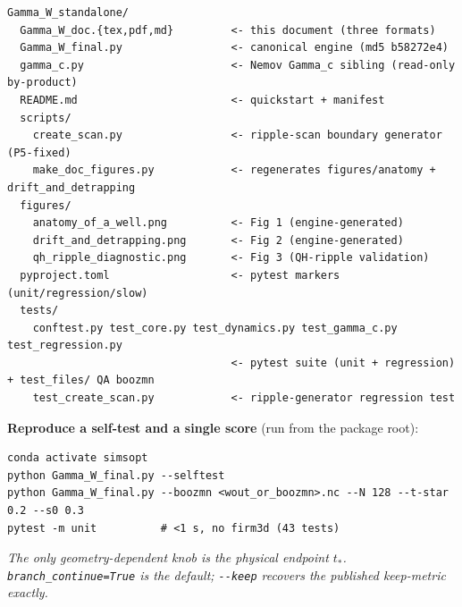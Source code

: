 \documentclass[11pt]{article}
\newcommand{\code}[1]{\texttt{#1}}
\begin{document}
\begin{Verbatim}[fontsize=\small,frame=single,rulecolor=\color{gray}]
Gamma_W_standalone/
  Gamma_W_doc.{tex,pdf,md}         <- this document (three formats)
  Gamma_W_final.py                 <- canonical engine (md5 b58272e4)
  gamma_c.py                       <- Nemov Gamma_c sibling (read-only by-product)
  README.md                        <- quickstart + manifest
  scripts/
    create_scan.py                 <- ripple-scan boundary generator (P5-fixed)
    make_doc_figures.py            <- regenerates figures/anatomy + drift_and_detrapping
  figures/
    anatomy_of_a_well.png          <- Fig 1 (engine-generated)
    drift_and_detrapping.png       <- Fig 2 (engine-generated)
    qh_ripple_diagnostic.png       <- Fig 3 (QH-ripple validation)
  pyproject.toml                   <- pytest markers (unit/regression/slow)
  tests/
    conftest.py test_core.py test_dynamics.py test_gamma_c.py test_regression.py
                                   <- pytest suite (unit + regression) + test_files/ QA boozmn
    test_create_scan.py            <- ripple-generator regression test
\end{Verbatim}

\textbf{Reproduce a self-test and a single score} (run from the package root):
\begin{Verbatim}[fontsize=\small,frame=single,rulecolor=\color{gray}]
conda activate simsopt
python Gamma_W_final.py --selftest
python Gamma_W_final.py --boozmn <wout_or_boozmn>.nc --N 128 --t-star 0.2 --s0 0.3
pytest -m unit          # <1 s, no firm3d (43 tests)
\end{Verbatim}

\vfill
\begin{center}\small\itshape
The only geometry-dependent knob is the physical endpoint $t_\ast$.\\
\code{branch\_continue=True} is the default; \code{-{}-keep} recovers the published keep-metric exactly.
\end{center}
\end{document}
